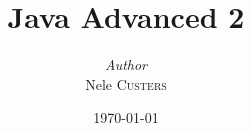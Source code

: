 \documentclass[a4paper, 12pt]{report}
\institute{Hogeschool PXL}
\title{Java Advanced 2}
\author{\textit{Author}\\Nele \textsc{Custers}}
\date{\today}
\begin{document}
    \maketitle
    \romantableofcontents
    



    

  








\printbibliography
\end{document}

